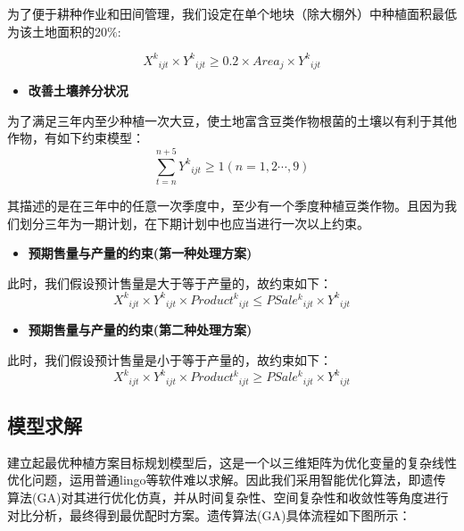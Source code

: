 \documentclass[withoutpreface,bwprint]{cumcmthesis} %
\begin{document}
	为了便于耕种作业和田间管理，我们设定在单个地块（除大棚外）中种植面积最低为该土地面积的20$\%$:
	
	\begin{equation}
		{X^k}_{ijt}\times {Y^k}_{ijt}\geqslant 0.2\times Area_j\times {Y^k}_{ijt}
	\end{equation}
	\begin{itemize}
	\item \textbf{改善土壤养分状况}
	\end{itemize}
	
	为了满足三年内至少种植一次大豆，使土地富含豆类作物根菌的土壤以有利于其他作物，有如下约束模型：
	\begin{equation}
	\sum_{t=n}^{n+5}{{Y^k}_{ijt}}\geqslant 1(n=1,2\cdots ,9)
	\end{equation}
	
	其描述的是在三年中的任意一次季度中，至少有一个季度种植豆类作物。且因为我们划分三年为一期计划，在下期计划中也应当进行一次以上约束。
	
	
	\begin{itemize}
		\item \textbf{预期售量与产量的约束(第一种处理方案)}
	\end{itemize}
	
	此时，我们假设预计售量是大于等于产量的，故约束如下：
	\begin{equation}
		{X^k}_{ijt}\times {Y^k}_{ijt}\times {Product^k}_{ijt}\leqslant {PSale^k}_{ijt}\times {Y^k}_{ijt}
	\end{equation}

\begin{itemize}
	\item \textbf{预期售量与产量的约束(第二种处理方案)}
\end{itemize}
	
此时，我们假设预计售量是小于等于产量的，故约束如下：
\begin{equation}
	{X^k}_{ijt}\times {Y^k}_{ijt}\times {Product^k}_{ijt}\geqslant {PSale^k}_{ijt}\times {Y^k}_{ijt}
\end{equation}
\subsection{模型求解}

建立起最优种植方案目标规划模型后，这是一个以三维矩阵为优化变量的复杂线性优化问题，运用普通lingo等软件难以求解。因此我们采用智能优化算法，即遗传算法(GA)对其进行优化仿真，并从时间复杂性、空间复杂性和收敛性等角度进行对比分析，最终得到最优配时方案。遗传算法(GA)具体流程如下图所示：
\end{document}
